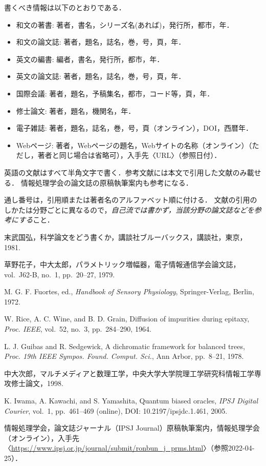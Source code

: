 \documentclass[10pt,a4paper,notitlepage,oneside,twocolumn]{abst_ltjsarticle}
\begin{document}
書くべき情報は以下のとおりである．
\begin{itemize}
\item 和文の著書: 著者，書名，シリーズ名(あれば)，発行所，都市，年．
\item 和文の論文誌: 著者，題名，誌名，巻，号，頁，年．
\item 英文の編書: 編者，書名，発行所，都市，年．
\item 英文の論文誌: 著者，題名，誌名，巻，号，頁，年．
\item 国際会議: 著者，題名，予稿集名，都市，コード等，頁，年．
\item 修士論文: 著者，題名，機関名，年．
\item 電子雑誌: 著者，題名，誌名，巻，号，頁（オンライン），DOI，西暦年．
\item Webページ: 著者，Webページの題名，Webサイトの名称（オンライン）（ただし，著者と同じ場合は省略可），入手先〈URL〉（参照日付）．
\end{itemize}
英語の文献はすべて半角文字で書く．参考文献には本文で引用した文献のみ載せる．
情報処理学会の論文誌の原稿執筆案内\cite{IPSJ}も参考になる．

通し番号は，引用順または著者名のアルファベット順に付ける．
文献の引用のしかたは分野ごとに異なるので，{\em 自己流では書かず，当該分野の論文誌などを参考にする}こと．


\begin{thebibliography}{99}

末武国弘，科学論文をどう書くか，講談社ブルーバックス，講談社，東京，1981. 

草野花子，中大太郎，パラメトリック増幅器，電子情報通信学会論文誌，vol.~J62-B, no.~1, pp.~20--27, 1979. 

M. G. F. Fuortes, ed., \textit{Handbook of Sensory Physiology}, Springer-Verlag, Berlin, 1972.

W. Rice, A. C. Wine, and B. D. Grain, Diffusion of impurities during epitaxy, \textit{Proc. IEEE}, vol.~52, no.~3, pp.~284--290, 1964.

L. J. Guibas and R. Sedgewick, A dichromatic framework for balanced trees, 
\textit{Proc. 19th IEEE Sympos. Found. Comput. Sci.}, Ann Arbor, pp.~8--21, 1978.

中大次郎，マルチメディアと数理工学，中央大学大学院理工学研究科情報工学専攻修士論文，1998.

K. Iwama, A. Kawachi, and S. Yamashita, Quantum biased oracles, \textit{IPSJ Digital Courier}, vol.~1, pp.~461--469 (online), DOI: 10.2197/ipsjdc.1.461, 2005.

情報処理学会，論文誌ジャーナル（IPSJ Journal）原稿執筆案内，情報処理学会（オンライン），入手先〈\url{https://www.ipsj.or.jp/journal/submit/ronbun_j_prms.html}〉（参照2022-04-25）．



\end{thebibliography}
\end{document}
